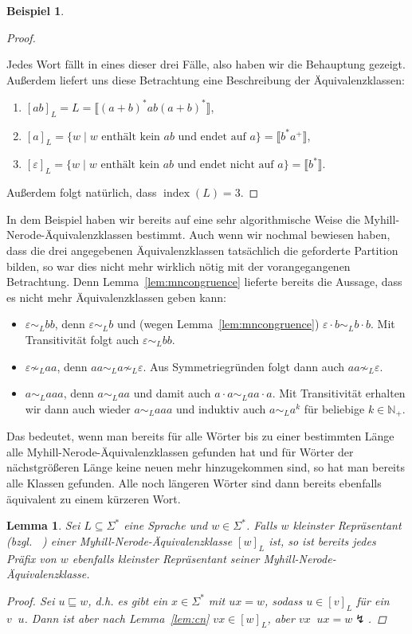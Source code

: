\documentclass[11pt, a4paper]{article}
\theoremstyle{definition}
\newtheorem{example}[definition]{Beispiel}
\theoremstyle{plain}
\newtheorem{lemma}[definition]{Lemma}
\numberwithin{equation}{section}
\DeclareMathOperator{\ind}{index}
\DeclareMathOperator{\canon}{\prec_\text{cn}}
\begin{document}
\begin{example}
\begin{proof}
\begin{enumerate}[label=\arabic*)]
		\end{enumerate}
		Jedes Wort fällt in eines dieser drei Fälle, also haben wir die Behauptung gezeigt. Außerdem liefert uns diese Betrachtung eine Beschreibung der Äquivalenzklassen:
		\begin{enumerate}[label=\arabic*)]
			\item $[ab]_L = L = \llbracket (a+b)^\ast ab (a+b)^\ast \rrbracket$,
			\item $[a]_L = \{w \mid w \text{ enthält kein } ab \text{ und endet auf } a\} = \llbracket b^\ast a^+ \rrbracket$,
			\item $[\varepsilon]_L = \{w \mid w \text{ enthält kein } ab \text{ und endet nicht auf } a\} = \llbracket b^\ast \rrbracket$.
		\end{enumerate}
		Außerdem folgt natürlich, dass $\ind(L) = 3$.
	\end{proof}
\end{example}
In dem Beispiel haben wir bereits auf eine sehr algorithmische Weise die Myhill-Nerode-Äquivalenzklassen bestimmt. Auch wenn wir nochmal bewiesen haben, dass die drei angegebenen Äquivalenzklassen tatsächlich die geforderte Partition bilden, so war dies nicht mehr wirklich nötig mit der vorangegangenen Betrachtung. Denn Lemma~\ref{lem:mncongruence} lieferte bereits die Aussage, dass es nicht mehr Äquivalenzklassen geben kann:
\begin{itemize}
	\item $\varepsilon \sim_L bb$, denn $\varepsilon \sim_L b$ und (wegen Lemma~\ref{lem:mncongruence}) $\varepsilon \cdot b \sim_L b \cdot b$. Mit Transitivität folgt auch $\varepsilon \sim_L bb$.
	\item $\varepsilon \not\sim_L aa$, denn $aa \sim_L a \not\sim_L \varepsilon$. Aus Symmetriegründen folgt dann auch $aa \not\sim_L \varepsilon$.
	\item $a \sim_L aaa$, denn $a \sim_L aa$ und damit auch $a \cdot a \sim_L aa \cdot a$. Mit Transitivität erhalten wir dann auch wieder $a \sim_L aaa$ und induktiv auch $a \sim_L a^k$ für beliebige $k \in \mathbb{N}_+$.
\end{itemize}
Das bedeutet, wenn man bereits für alle Wörter bis zu einer bestimmten Länge alle Myhill-Nerode-Äquivalenzklassen gefunden hat und für Wörter der nächstgrößeren Länge keine neuen mehr hinzugekommen sind, so hat man bereits alle Klassen gefunden. Alle noch längeren Wörter sind dann bereits ebenfalls äquivalent zu einem kürzeren Wort. 
\begin{lemma}
	Sei $L \subseteq \Sigma^\ast$ eine Sprache und $w \in \Sigma^\ast$. Falls $w$ kleinster Repräsentant (bzgl. $\canon$) einer Myhill-Nerode-Äquivalenzklasse $[w]_L$ ist, so ist bereits jedes Präfix von $w$ ebenfalls kleinster Repräsentant seiner Myhill-Nerode-Äquivalenzklasse.
	\begin{proof}
		Sei $u \sqsubseteq w$, d.h. es gibt ein $x \in \Sigma^\ast$ mit $ux = w$, sodass $u \in [v]_L$ für ein $v \canon u$. Dann ist aber nach Lemma~\ref{lem:cn} $vx \in [w]_L$, aber $vx \canon ux = w \lightning$.
	\end{proof}
\end{lemma}
\end{document}
